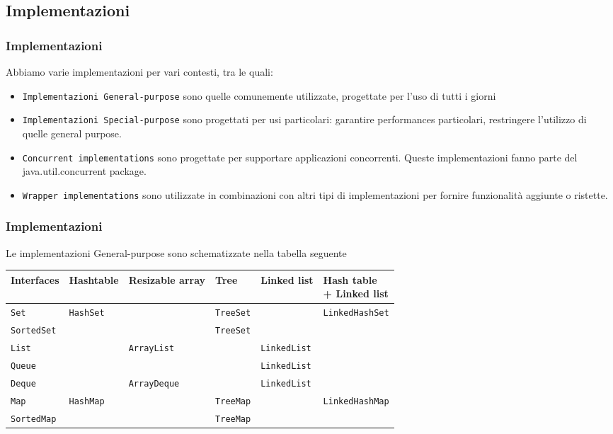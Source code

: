 \documentclass{beamer}
\begin{document}
\subsection{Implementazioni}
\begin{frame}[fragile]
\frametitle{Implementazioni}
Abbiamo varie implementazioni per vari contesti, tra le quali:
\begin{itemize}
\item \texttt{Implementazioni General-purpose} sono quelle comunemente utilizzate, progettate per l'uso di tutti i giorni
\item \texttt{Implementazioni Special-purpose} sono progettati per usi particolari: garantire performances particolari, restringere l'utilizzo di quelle general purpose.
\item \texttt{Concurrent implementations} sono progettate per supportare applicazioni concorrenti. Queste implementazioni fanno parte del  java.util.concurrent package.
\item \texttt{Wrapper implementations} sono utilizzate in combinazioni con altri tipi di implementazioni per fornire funzionalit\`a aggiunte o ristette.
\end{itemize}
\end{frame}
%

\begin{frame}[fragile]
\frametitle{Implementazioni}
Le implementazioni General-purpose sono schematizzate nella tabella seguente 
\begin{table}[!ht]
{\footnotesize
\begin{tabular}{ | l | l | l | l | l | l |}
\hline
  Interfaces & Hashtable  & Resizable array  & Tree  & Linked list  & \pbox{20cm}{Hash table \\ + Linked list}  \\
  \hline
  \texttt{Set} & \texttt{HashSet} &  & \texttt{TreeSet} && \texttt{LinkedHashSet} \\
  \hline
    \texttt{SortedSet} & &  & \texttt{TreeSet} &&  \\
  \hline
  \texttt{List} &  & \texttt{ArrayList}  & & \texttt{LinkedList} & \\
\hline  
  \texttt{Queue} &  & & & \texttt{LinkedList} &  \\
\hline  
  \texttt{Deque} &  & \texttt{ArrayDeque} & & \texttt{LinkedList} & \\
\hline  
  \texttt{Map} & \texttt{HashMap} & & \texttt{TreeMap} && \texttt{LinkedHashMap} \\
  \hline
    \texttt{SortedMap} & & & \texttt{TreeMap} &&  \\
\hline    
\end{tabular} }
\end{table}
\end{frame}
\end{document}
